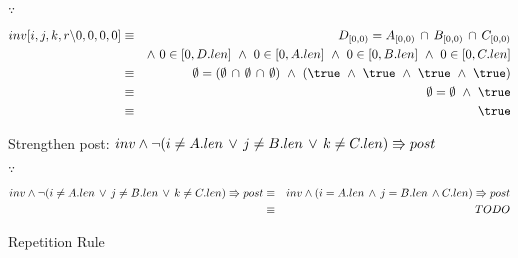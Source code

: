 \documentclass{article}
\begin{document}
$\because$

\begin{eqnarray*}
inv[i, j, k, r\backslash 0, 0, 0, 0] 
    & \equiv & D_{[0, 0)} = A_{[0, 0)}\, \cap\, B_{[0, 0)}\, \cap\, C_{[0, 0)}\\
     && \land~ 0 \in [0, D.len] ~\land~ 0 \in [0, A.len] ~\land~ 0 \in [0, B.len] ~\land~ 0 \in [0, C.len]\\
     & \equiv & \emptyset = (\emptyset\, \cap\, \emptyset\, \cap\, \emptyset) ~\land~ (\true ~\land~ \true ~\land~ \true ~\land~ \true)\\
     & \equiv & \emptyset = \emptyset ~\land~ \true\\
     & \equiv & \true
\end{eqnarray*}

\DERIVE
{} {Strengthen post: $inv \land \neg(i \neq A.len \,\lor\, j \neq B.len\,\lor\, k \neq C.len) \Rrightarrow post$}
\ENDDERIVE

$\because$

\begin{eqnarray*}
inv \land \neg(i \neq A.len\, \lor\, j \neq B.len\, \lor\, k \neq C.len) \Rrightarrow post & \equiv & inv \land (i = A.len\, \land\, j = B.len\, \land C.len) \Rrightarrow post\\
& \equiv & TODO
\end{eqnarray*}

\DERIVE
{} {Repetition Rule}
\ENDDERIVE


\end{document}

